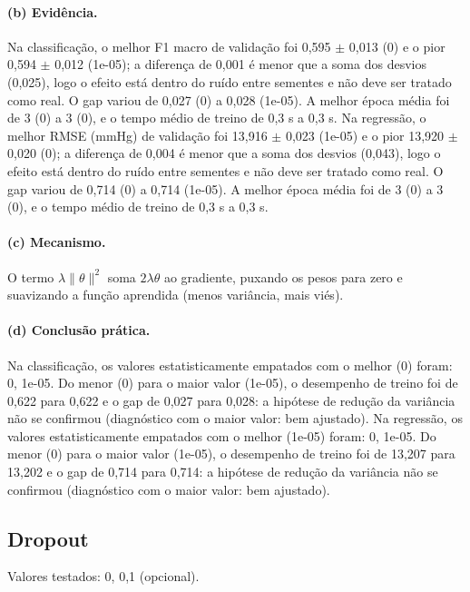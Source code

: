 \documentclass[11pt,a4paper]{article}
\begin{document}
\paragraph{(b) Evidência.} Na classificação, o melhor F1 macro de validação foi 0,595 $\pm$ 0,013 (0) e o pior 0,594 $\pm$ 0,012 (1e-05); a diferença de 0,001 é menor que a soma dos desvios (0,025), logo o efeito está dentro do ruído entre sementes e não deve ser tratado como real. O gap variou de 0,027 (0) a 0,028 (1e-05). A melhor época média foi de 3 (0) a 3 (0), e o tempo médio de treino de 0,3 s a 0,3 s. Na regressão, o melhor RMSE (mmHg) de validação foi 13,916 $\pm$ 0,023 (1e-05) e o pior 13,920 $\pm$ 0,020 (0); a diferença de 0,004 é menor que a soma dos desvios (0,043), logo o efeito está dentro do ruído entre sementes e não deve ser tratado como real. O gap variou de 0,714 (0) a 0,714 (1e-05). A melhor época média foi de 3 (0) a 3 (0), e o tempo médio de treino de 0,3 s a 0,3 s.

\paragraph{(c) Mecanismo.} O termo $\lambda\lVert\theta\rVert^2$ soma $2\lambda\theta$ ao gradiente, puxando os pesos para zero e suavizando a função aprendida (menos variância, mais viés).

\paragraph{(d) Conclusão prática.} Na classificação, os valores estatisticamente empatados com o melhor (0) foram: 0, 1e-05. Do menor (0) para o maior valor (1e-05), o desempenho de treino foi de 0,622 para 0,622 e o gap de 0,027 para 0,028: a hipótese de redução da variância não se confirmou (diagnóstico com o maior valor: bem ajustado). Na regressão, os valores estatisticamente empatados com o melhor (1e-05) foram: 0, 1e-05. Do menor (0) para o maior valor (1e-05), o desempenho de treino foi de 13,207 para 13,202 e o gap de 0,714 para 0,714: a hipótese de redução da variância não se confirmou (diagnóstico com o maior valor: bem ajustado).

\subsection{Dropout}
Valores testados: 0, 0,1 (opcional).
\end{document}
